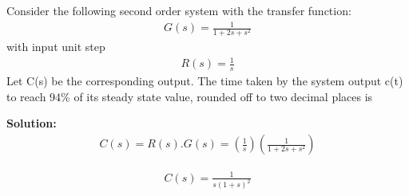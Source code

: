\item
%
Consider the following second order system with the transfer function:
\begin{multline}
G(s) = \frac{1}{1+2s+s^2}
\end{multline}
with input unit step 
\begin{multline}
R(s) = \frac{1}{s}
\end{multline}
 Let C(s) be the corresponding output. The time taken by the system output c(t) to reach 94\% of its steady state value, rounded off to two decimal places is



\textbf{Solution:}
\begin{multline}
C(s) = R(s).G(s) = (\frac{1}{s})  (\frac{1}{1+2s+s^2})
\end{multline}

\begin{multline}
C(s) =  \frac{1}{s(1+s)^2}
\end{multline}

    
